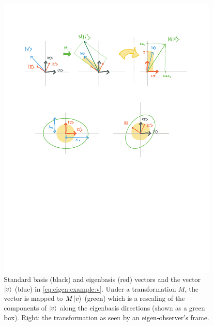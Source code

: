 \documentclass[12pt, oneside]{report}    %
\begin{document}
\begin{figure}[tb]
    \centering
    \includegraphics[width=.8\textwidth]{figures/eigen_transform.pdf}
    \caption{Standard basis (black) and eigenbasis (red) vectors and the vector $\left|v\right\rangle$ (blue) in \eqref{eq:eigen:example:v}. Under a transformation $M$, the vector is mapped to $M\left|v\right\rangle$ (green) which is a rescaling of the components of $\left|v\right\rangle$ along the eigenbasis directions (shown as a green box). Right: the transformation as seen by an eigen-observer's frame.}
    \label{fig:eigentransform}
\end{figure}
\end{document}
